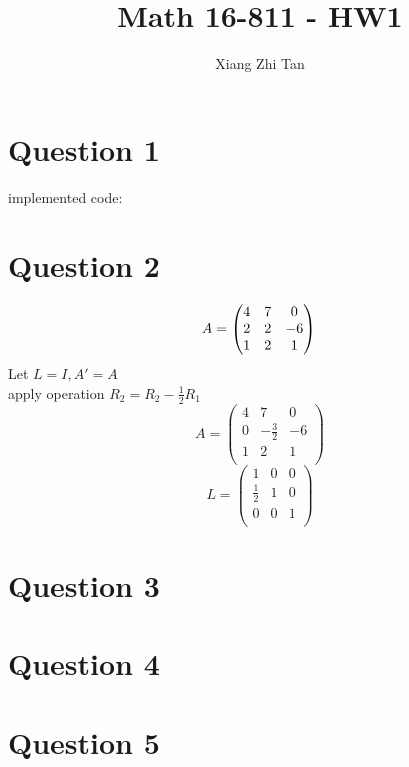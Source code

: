 \documentclass{article}
\begin{document}
\title{Math 16-811 - HW1}
\author{Xiang Zhi Tan}

\maketitle

\section{Question 1}
implemented code:

\section{Question 2}
\begin{equation}
A = 
\begin{pmatrix}
    4 & 7 & 0 \\
    2 & 2 & -6 \\
    1 & 2 & 1 \\
\end{pmatrix} 
\\
\end{equation}
Let $ L = I, A' = A$ \\
apply operation $R_2 = R_2 - \frac{1}{2} R_1$ \\
\begin{equation}

A = 
\begin{pmatrix}
    4 & 7 & 0 \\
    0 & -\frac{3}{2} & -6 \\
    1 & 2 & 1 \\
\end{pmatrix} 
\end{equation}
\begin{equation}
L = 
\begin{pmatrix}
    1 & 0 & 0 \\
    \frac{1}{2} & 1 & 0 \\
    0 & 0 & 1 \\
\end{pmatrix} 
\end{equation}
\section{Question 3}
\section{Question 4}
\section{Question 5}
\end{document}
